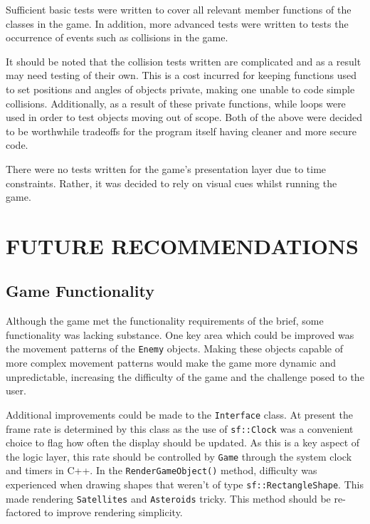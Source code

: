 \documentclass[10pt,twocolumn]{witseiepaper}
\begin{document}
Sufficient basic tests were written to cover all relevant member functions of the classes in the game. In addition, more advanced tests were written to tests the occurrence of events such as collisions in the game. 

It should be noted that the collision tests written are complicated and as a result may need testing of their own. This is a cost incurred for keeping functions used to set positions and angles of objects private, making one unable to code simple collisions. Additionally, as a result of these private functions, while loops were used in order to test objects moving out of scope. Both of the above were decided to be worthwhile tradeoffs for the program itself having cleaner and more secure code.

There were no tests written for the game's presentation layer due to time constraints. Rather, it was decided to rely on visual cues whilst running the game. 

\section{FUTURE RECOMMENDATIONS}

\subsection{Game Functionality}

Although the game met the functionality requirements of the brief, some functionality was lacking substance. One key area which could be improved was the movement patterns of the \texttt{Enemy} objects. Making these objects capable of more complex movement patterns would make the game more dynamic and unpredictable, increasing the difficulty of the game and the challenge posed to the user.


Additional improvements could be made to the \texttt{Interface} class. At present the frame rate is determined by this class as the use of \texttt{sf::Clock} was a convenient choice to flag how often the display should be updated. As this is a key aspect of the logic layer, this rate should be controlled by \texttt{Game} through the system clock and timers in C++. In the \texttt{RenderGameObject()} method, difficulty was experienced when drawing shapes that weren't of type \texttt{sf::RectangleShape}. This made rendering \texttt{Satellites} and \texttt{Asteroids} tricky. This method should be re-factored to improve rendering simplicity.
\end{document}
